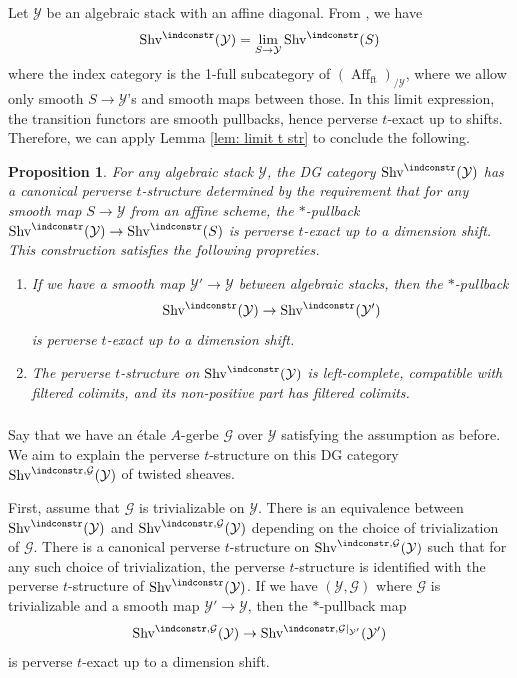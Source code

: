\documentclass[10pt]{amsart}
\newcommand{\sssec}{\subsubsection}
\newtheorem{prop}[subsubsection]{Proposition}
\theoremstyle{remark}
\newcommand{\on}{\operatorname}
\newcommand{\cG}{\mathcal{G}}
\newcommand{\cY}{\mathcal{Y}}
\newcommand{\Shv}{\on{Shv}}
\newcommand{\Affft}{\on{Aff}_{\on{ft}}}
\begin{document}
\sssec{}
Let $\cY$ be an algebraic stack with an affine diagonal. From \cite[F.1.2]{AGKRRV}, we have 
\[\Shv^{\indconstr}(\cY)= \lim_{S\rightarrow \cY}\Shv^{\indconstr}(S)\]
where the index category is the 1-full subcategory of $(\Affft)_{/\cY}$, where we allow only smooth $S\rightarrow \cY$'s and smooth maps between those. In this limit expression, the transition functors are smooth pullbacks, hence perverse $t$-exact up to shifts. Therefore, we can apply Lemma \ref{lem: limit t str} to conclude the following.

\begin{prop}\label{prop: t str indconstr alg stk}
For any algebraic stack $\cY$, the DG category $\Shv^{\indconstr}(\cY)$ has a canonical perverse $t$-structure determined by the requirement that for any smooth map $S\rightarrow\cY$ from an affine scheme, the $*$-pullback $\Shv^{\indconstr}(\cY)\rightarrow \Shv^{\indconstr}(S)$ is perverse $t$-exact up to a dimension shift. This construction satisfies the following propreties.
    \begin{enumerate}
        \item If we have a smooth map $\cY'\rightarrow\cY$ between algebraic stacks, then the $*$-pullback
    \[\Shv^{\indconstr}(\cY)\rightarrow \Shv^{\indconstr}(\cY')\]
    is perverse $t$-exact up to a dimension shift.
    \item The perverse $t$-structure on $\Shv^{\indconstr}(\cY)$ is left-complete, compatible with filtered colimits, and its non-positive part has filtered colimits.
    \end{enumerate}
\end{prop}

\sssec{}\label{sssec: t str on twisted sheaves triv case}
Say that we have an \'etale $A$-gerbe $\cG$ over $\cY$ satisfying the assumption as before.  We aim to explain the perverse $t$-structure on this DG category $\Shv^{\indconstr,\cG}(\cY)$ of twisted sheaves.
\medskip

First, assume that $\cG$ is trivializable on $\cY$. There is an equivalence between $\Shv^{\indconstr}(\cY)$ and $\Shv^{\indconstr,\cG}(\cY)$ depending on the choice of trivialization of $\cG$. There is a canonical perverse $t$-structure on $\Shv^{\indconstr,\cG}(\cY)$ such that for any such choice of trivialization, the perverse $t$-structure is identified with the perverse $t$-structure of $\Shv^{\indconstr}(\cY)$.
 If we have $(\cY,\cG)$ where $\cG$ is trivializable and a smooth map $\cY'\rightarrow\cY$, then the $*$-pullback map
\[\Shv^{\indconstr,\cG}(\cY)\rightarrow \Shv^{\indconstr,\cG|_{\cY'}}(\cY')\]
is perverse $t$-exact up to a dimension shift.
\medskip
\end{document}
